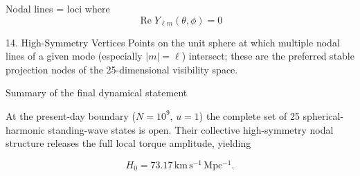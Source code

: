 Nodal lines = loci where
\[
\operatorname{Re} Y_{\ell m}(\theta,\phi) = 0
\]

14. High-Symmetry Vertices
Points on the unit sphere at which multiple nodal lines of a given mode (especially \(|m|=\ell\)) intersect; these are the preferred stable projection nodes of the 25-dimensional visibility space.

Summary of the final dynamical statement

At the present-day boundary (\(N=10^9\), \(u=1\)) the complete set of 25 spherical-harmonic standing-wave states is open. Their collective high-symmetry nodal structure releases the full local torque amplitude, yielding

\[
H_0 = 73.17\,\mathrm{km\,s^{-1}\,Mpc^{-1}}.
\]
